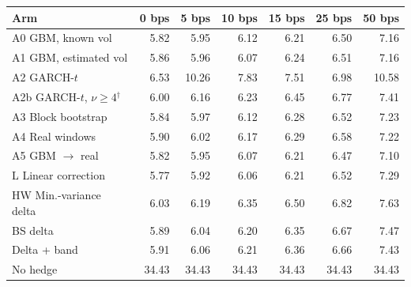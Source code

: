 \begin{tabular}{lrrrrrr}
\toprule
Arm & 0 bps & 5 bps & 10 bps & 15 bps & 25 bps & 50 bps \\
\midrule
A0 GBM, known vol & 5.82 & 5.95 & 6.12 & 6.21 & 6.50 & 7.16 \\
A1 GBM, estimated vol & 5.86 & 5.96 & 6.07 & 6.24 & 6.51 & 7.16 \\
A2 GARCH-$t$ & 6.53 & 10.26 & 7.83 & 7.51 & 6.98 & 10.58 \\
A2b GARCH-$t$, $\nu\ge4$$^\dagger$ & 6.00 & 6.16 & 6.23 & 6.45 & 6.77 & 7.41 \\
A3 Block bootstrap & 5.84 & 5.97 & 6.12 & 6.28 & 6.52 & 7.23 \\
A4 Real windows & 5.90 & 6.02 & 6.17 & 6.29 & 6.58 & 7.22 \\
A5 GBM $\to$ real & 5.82 & 5.95 & 6.07 & 6.21 & 6.47 & 7.10 \\
L Linear correction & 5.77 & 5.92 & 6.06 & 6.21 & 6.52 & 7.29 \\
HW Min.-variance delta & 6.03 & 6.19 & 6.35 & 6.50 & 6.82 & 7.63 \\
BS delta & 5.89 & 6.04 & 6.20 & 6.35 & 6.67 & 7.47 \\
Delta + band & 5.91 & 6.06 & 6.21 & 6.36 & 6.66 & 7.43 \\
No hedge & 34.43 & 34.43 & 34.43 & 34.43 & 34.43 & 34.43 \\
\bottomrule
\end{tabular}
